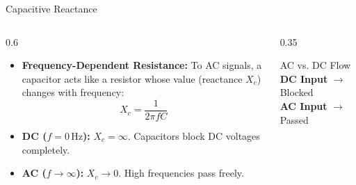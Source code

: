 \documentclass[aspectratio=169]{beamer}
\begin{document}
\begin{frame}{Capacitive Reactance}
    \begin{columns}[T]
        \begin{column}{0.6\textwidth}
            \begin{itemize}
                \item \textbf{Frequency-Dependent Resistance:} To AC signals, a capacitor acts like a resistor whose value (reactance $X_c$) changes with frequency:
                \begin{equation*}
                    X_c = \frac{1}{2\pi f C}
                \end{equation*}
                \item \textbf{DC ($f = 0\,\text{Hz}$):} $X_c = \infty$. Capacitors block DC voltages completely.
                \item \textbf{AC ($f \rightarrow \infty$):} $X_c \rightarrow 0$. High frequencies pass freely.
            \end{itemize}
        \end{column}
        \begin{column}{0.35\textwidth}
            \centering
            \vspace{1cm}
            \begin{block}{AC vs. DC Flow}
                \centering
                \textbf{DC Input} $\rightarrow$ Blocked \\
                \vspace{0.2cm}
                \textbf{AC Input} $\rightarrow$ Passed
            \end{block}
        \end{column}
    \end{columns}
\end{frame}
\end{document}
